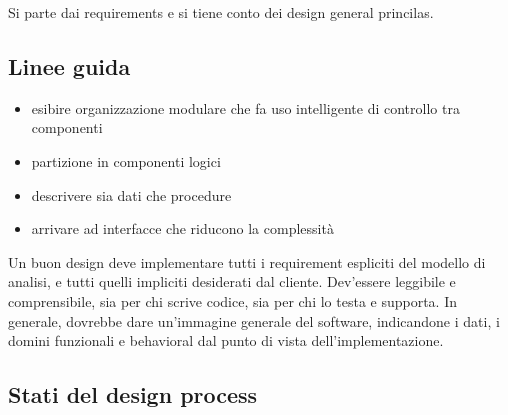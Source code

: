 \documentclass{article}
\begin{document}
Si parte dai requirements e si tiene conto dei design general princilas.

\subsection{Linee guida}
\begin{itemize}
    \item esibire organizzazione modulare che fa uso intelligente di controllo tra componenti
    \item partizione in componenti logici
    \item descrivere sia dati che procedure
    \item arrivare ad interfacce che riducono la complessità
\end{itemize}

Un buon design deve implementare tutti i requirement espliciti del modello di analisi, e tutti quelli impliciti
desiderati dal cliente. Dev'essere leggibile e comprensibile, sia per chi scrive codice, sia per chi lo testa
e supporta. In generale, dovrebbe dare un'immagine generale del software, indicandone i dati, i domini
funzionali e behavioral dal punto di vista dell'implementazione.



\subsection{Stati del design process}
\end{document}
